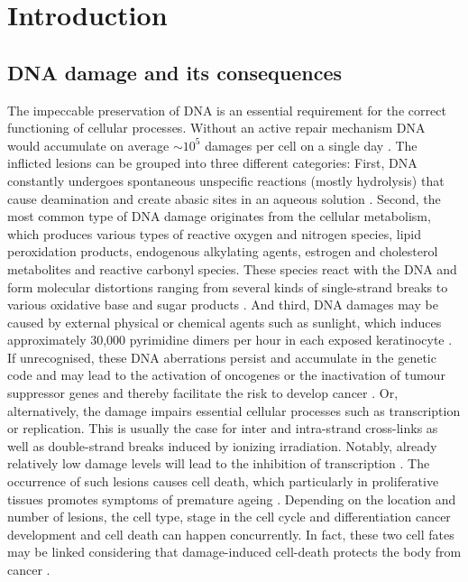 \chapter{Introduction}
\pagestyle{plain}

\section{DNA damage and its consequences}

The impeccable preservation of DNA is an essential requirement for the correct functioning of cellular processes. Without an active repair mechanism DNA would accumulate on average $\sim$$\text{10}^\text{5}$ damages per cell on a single day \cite{Hoeijmakers2009}. The inflicted lesions can be grouped into three different categories: First, DNA constantly undergoes spontaneous unspecific reactions (mostly hydrolysis) that cause deamination and create abasic sites in an aqueous solution \cite{Lindahl1993,Lhomme1999}. Second, the most common type of DNA damage originates from the cellular metabolism, which produces various types of reactive oxygen and nitrogen species, lipid peroxidation products, endogenous alkylating agents, estrogen and cholesterol metabolites and reactive carbonyl species. These species react with the DNA and form molecular distortions ranging from several kinds of single-strand breaks to various oxidative base and sugar products \cite{DeBont2004,Sander2005}. And third, DNA damages may be caused by external physical or chemical agents such as sunlight, which induces approximately 30,000 pyrimidine dimers per hour in each exposed keratinocyte \cite{Luijsterburg2010}.\\        
If unrecognised, these DNA aberrations persist and accumulate in the genetic code and may lead to the activation of  oncogenes or the inactivation of tumour suppressor genes and thereby facilitate the risk to develop cancer \cite{Bartek2007}. Or, alternatively, the damage impairs essential cellular processes such as transcription or replication. This is usually the case for inter and intra-strand cross-links as well as double-strand breaks induced by ionizing irradiation. Notably, already relatively low damage levels will lead to the inhibition of transcription \cite{Mone2001}. The occurrence of such lesions causes cell death, which particularly in proliferative tissues promotes symptoms of premature ageing \cite{Marteijn2014}. Depending on the location and number of lesions, the cell type, stage in the cell cycle and differentiation cancer development and cell death can happen concurrently. In fact, these two cell fates may be linked considering that damage-induced cell-death protects the body from cancer \cite{Hoeijmakers2009}.            

